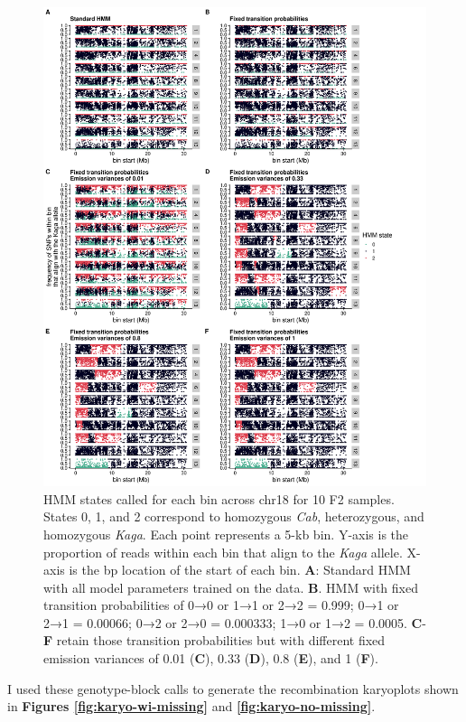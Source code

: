 \documentclass[
]{book}
\begin{document}
\begin{figure}
\includegraphics[width=1\linewidth]{figs/somites/scatter_collage} \caption{HMM states called for each bin across chr18 for 10 F2 samples. States 0, 1, and 2 correspond to homozygous \emph{Cab}, heterozygous, and homozygous \emph{Kaga}. Each point represents a 5-kb bin. Y-axis is the proportion of reads within each bin that align to the \emph{Kaga} allele. X-axis is the bp location of the start of each bin. \textbf{A}: Standard HMM with all model parameters trained on the data. \textbf{B}. HMM with fixed transition probabilities of 0→0 or 1→1 or 2→2 = 0.999; 0→1 or 2→1 = 0.00066; 0→2 or 2→0 = 0.000333; 1→0 or 1→2 = 0.0005. \textbf{C}-\textbf{F} retain those transition probabilities but with different fixed emission variances of 0.01 (\textbf{C}), 0.33 (\textbf{D}), 0.8 (\textbf{E}), and 1 (\textbf{F}).}\label{fig:hmm-scatter-diagnoses}
\end{figure}

I used these genotype-block calls to generate the recombination karyoplots shown in \textbf{Figures \ref{fig:karyo-wi-missing}} and \textbf{\ref{fig:karyo-no-missing}}.
\end{document}
